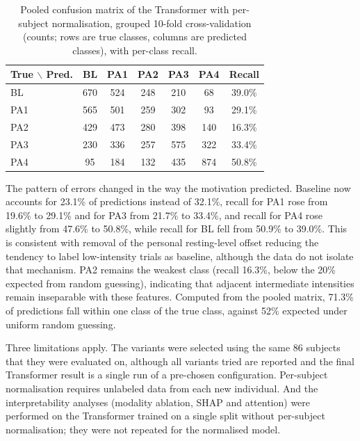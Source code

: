 \begin{table}[h]
\centering
\small
\caption{Pooled confusion matrix of the Transformer with per-subject normalisation, grouped 10-fold cross-validation (counts; rows are true classes, columns are predicted classes), with per-class recall.}
\label{tab:cv-subjnorm-confusion}
\begin{tabular}{lccccc c}
\hline
\textbf{True} $\backslash$ \textbf{Pred.} & BL & PA1 & PA2 & PA3 & PA4 & Recall \\
\hline
BL & 670 & 524 & 248 & 210 & 68 & 39.0\% \\
PA1 & 565 & 501 & 259 & 302 & 93 & 29.1\% \\
PA2 & 429 & 473 & 280 & 398 & 140 & 16.3\% \\
PA3 & 230 & 336 & 257 & 575 & 322 & 33.4\% \\
PA4 & 95 & 184 & 132 & 435 & 874 & 50.8\% \\
\hline
\end{tabular}
\end{table}

The pattern of errors changed in the way the motivation predicted. Baseline now accounts for 23.1\% of predictions instead of 32.1\%, recall for PA1 rose from 19.6\% to 29.1\% and for PA3 from 21.7\% to 33.4\%, and recall for PA4 rose slightly from 47.6\% to 50.8\%, while recall for BL fell from 50.9\% to 39.0\%. This is consistent with removal of the personal resting-level offset reducing the tendency to label low-intensity trials as baseline, although the data do not isolate that mechanism. PA2 remains the weakest class (recall 16.3\%, below the 20\% expected from random guessing), indicating that adjacent intermediate intensities remain inseparable with these features. Computed from the pooled matrix, 71.3\% of predictions fall within one class of the true class, against 52\% expected under uniform random guessing.

Three limitations apply. The variants were selected using the same 86 subjects that they were evaluated on, although all variants tried are reported and the final Transformer result is a single run of a pre-chosen configuration. Per-subject normalisation requires unlabeled data from each new individual. And the interpretability analyses (modality ablation, SHAP and attention) were performed on the Transformer trained on a single split without per-subject normalisation; they were not repeated for the normalised model.


